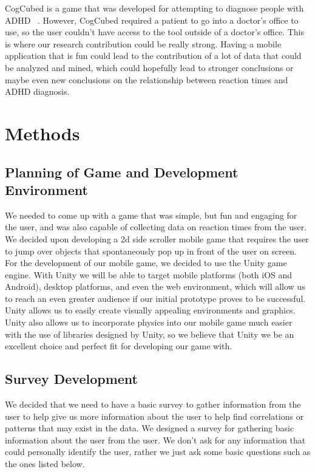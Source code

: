 \documentclass[a4wide]{article}
\begin{document}
\- CogCubed is a game that was developed for attempting to diagnose people with ADHD ~\cite{Heller2013}. However, CogCubed required a patient to go into a doctor's office to use, so the user couldn't have access to the tool outside of a doctor's office. This is where our research contribution could be really strong. Having a mobile application that is fun could lead to the contribution of a lot of data that could be analyzed and mined, which could hopefully lead to stronger conclusions or maybe even new conclusions on the relationship between reaction times and ADHD diagnosis.

\section{Methods}
\subsection{Planning of Game and Development Environment}
\- We needed to come up with a game that was simple, but fun and engaging for the user, and was also capable of collecting data on reaction times from the user. We decided upon developing a 2d side scroller mobile game that requires the user to jump over objects that spontaneously pop up in front of the user on screen.\newline
\- For the development of our mobile game, we decided to use the Unity game engine. With Unity we will be able to target mobile platforms (both iOS and Android), desktop platforms, and even the web environment, which will allow us to reach an even greater audience if our initial prototype proves to be successful. Unity allows us to easily create visually appealing environments and graphics. Unity also allows us to incorporate physics into our mobile game much easier with the use of libraries designed by Unity, so we believe that Unity we be an excellent choice and perfect fit for developing our game with.

\subsection{Survey Development}
\- We decided that we need to have a basic survey to gather information from the user to help give us more information about the user to help find correlations or patterns that may exist in the data. We designed a survey for gathering basic information about the user from the user. We don't ask for any information that could personally identify the user, rather we just ask some basic questions such as the ones listed below.
\end{document}
